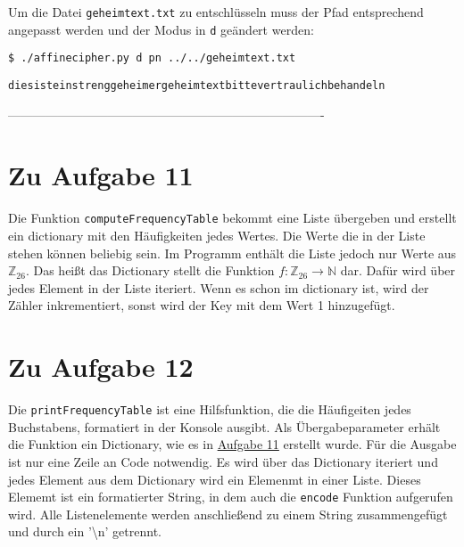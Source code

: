 \documentclass[12pt]{article}
\begin{document}
Um die Datei \texttt{geheimtext.txt} zu entschlüsseln muss der Pfad entsprechend angepasst werden und der Modus in \texttt{d} geändert werden:

\begin{lstlisting}
$ ./affinecipher.py d pn ../../geheimtext.txt
\end{lstlisting}

\begin{lstlisting}
diesisteinstrenggeheimergeheimtextbittevertraulichbehandeln
\end{lstlisting}


%
 ----------------------------------------------------------------------------
\section{Zu Aufgabe 11}
\label{sec:aufgabe_11}

Die Funktion \texttt{computeFrequencyTable} bekommt eine Liste übergeben und erstellt ein dictionary mit den Häufigkeiten jedes Wertes. Die Werte die in der Liste stehen können beliebig sein. Im Programm enthält die Liste jedoch nur Werte aus $\mathbb{Z}_{26}$. Das heißt das Dictionary stellt die Funktion $f: \mathbb{Z}_{26} \to \mathbb{N}$ dar. Dafür wird über jedes Element in der Liste iteriert. Wenn es schon im dictionary ist, wird der Zähler inkrementiert, sonst wird der Key mit dem Wert 1 hinzugefügt.


\section{Zu Aufgabe 12}

Die \texttt{printFrequencyTable} ist eine Hilfsfunktion, die die Häufigeiten jedes Buchstabens, formatiert in der Konsole ausgibt. Als Übergabeparameter erhält die Funktion ein Dictionary, wie es in \hyperref[sec:aufgabe_11]{Aufgabe 11} erstellt wurde. Für die Ausgabe ist nur eine Zeile an Code notwendig. Es wird über das Dictionary iteriert und jedes Element aus dem Dictionary wird ein Elemenmt in einer Liste. Dieses Elememt ist ein formatierter String, in dem auch die \texttt{encode} Funktion aufgerufen wird. Alle Listenelemente werden anschließend zu einem String zusammengefügt und durch ein '\textbackslash n' getrennt.
\end{document}
